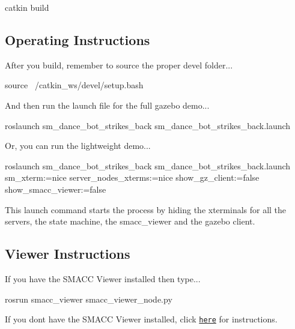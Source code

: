 \begin{DoxyCode}
catkin build
\end{DoxyCode}
 \subsection*{Operating Instructions}

After you build, remember to source the proper devel folder...


\begin{DoxyCode}
source ~/catkin\_ws/devel/setup.bash
\end{DoxyCode}


And then run the launch file for the full gazebo demo...


\begin{DoxyCode}
roslaunch sm\_dance\_bot\_strikes\_back sm\_dance\_bot\_strikes\_back.launch
\end{DoxyCode}


Or, you can run the lightweight demo...


\begin{DoxyCode}
roslaunch sm\_dance\_bot\_strikes\_back sm\_dance\_bot\_strikes\_back.launch sm\_xterm:=nice
       server\_nodes\_xterms:=nice show\_gz\_client:=false show\_smacc\_viewer:=false
\end{DoxyCode}


This launch command starts the process by hiding the xterminals for all the servers, the state machine, the smacc\+\_\+viewer and the gazebo client.

\subsection*{Viewer Instructions}

If you have the S\+M\+A\+CC Viewer installed then type...


\begin{DoxyCode}
rosrun smacc\_viewer smacc\_viewer\_node.py
\end{DoxyCode}


If you don\textquotesingle{}t have the S\+M\+A\+CC Viewer installed, click \href{http://smacc.ninja/smacc-viewer/}{\tt here} for instructions. 